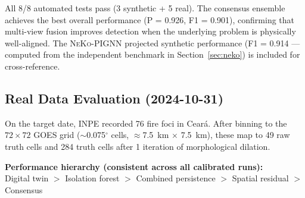 \documentclass[5p,twocolumn]{elsarticle}
\newcommand{\abbrev}[1]{{\small\textsc{#1}}}
\begin{document}
All 8/8 automated tests pass (3 synthetic + 5 real). The consensus ensemble achieves the best overall performance (P = 0.926, F1 = 0.901), confirming that multi-view fusion improves detection when the underlying problem is physically well-aligned. The \abbrev{NeKo-PIGNN} projected synthetic performance (F1 = 0.914 --- computed from the independent benchmark in Section~\ref{sec:neko}) is included for cross-reference.

\subsection{Real Data Evaluation (2024-10-31)}

On the target date, \abbrev{INPE} recorded 76 fire foci in Cear\'{a}. After binning to the $72\times 72$ \abbrev{GOES} grid ($\sim$0.075$^\circ$ cells, $\approx$7.5~km $\times$ 7.5~km), these map to 49 raw truth cells and 284 truth cells after 1 iteration of morphological dilation.

\begin{table}[htbp]
\centering
\caption{Real data evaluation against 76 \abbrev{INPE} foci (2024-10-31).}
\label{tab:real}
\small
{}
\end{table}

\textbf{Performance hierarchy (consistent across all calibrated runs):}\\
Digital twin $>$ Isolation forest $>$ Combined persistence $>$ Spatial residual $>$ Consensus
\end{document}
